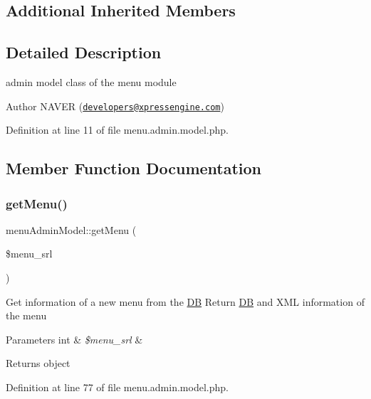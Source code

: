 \subsection*{Additional Inherited Members}


\subsection{Detailed Description}
admin model class of the menu module 

\begin{DoxyAuthor}{Author}
N\+A\+V\+ER (\href{mailto:developers@xpressengine.com}{\tt developers@xpressengine.\+com}) 
\end{DoxyAuthor}


Definition at line 11 of file menu.\+admin.\+model.\+php.



\subsection{Member Function Documentation}
\hypertarget{classmenuAdminModel_a303e32a7d98c99847035407e7ed4e951}{}\label{classmenuAdminModel_a303e32a7d98c99847035407e7ed4e951} 
\subsubsection{\texorpdfstring{get\+Menu()}{getMenu()}}
{\footnotesize\ttfamily menu\+Admin\+Model\+::get\+Menu (\begin{DoxyParamCaption}\item[{}]{\$menu\+\_\+srl }\end{DoxyParamCaption})}

Get information of a new menu from the \hyperlink{classDB}{DB} Return \hyperlink{classDB}{DB} and X\+ML information of the menu 
\begin{DoxyParams}[1]{Parameters}
int & {\em \$menu\+\_\+srl} & \\
\hline
\end{DoxyParams}
\begin{DoxyReturn}{Returns}
object 
\end{DoxyReturn}


Definition at line 77 of file menu.\+admin.\+model.\+php.

\hypertarget{classmenuAdminModel_ac55866233401318f5c9c2529a924c06b}{}\label{classmenuAdminModel_ac55866233401318f5c9c2529a924c06b} 
